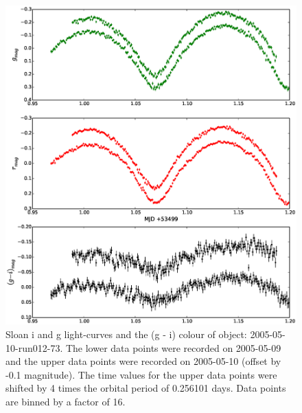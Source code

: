    \begin{figure}
     \center
     \includegraphics[width=120mm]{images/2005-05-10-run012-phasedlc.eps} 
     \caption{Sloan i and g light-curves and the (g - i) colour of object: 2005-05-10-run012-73. The lower data points were recorded on 2005-05-09 and the upper data points were recorded on 2005-05-10 (offset by -0.1 magnitude). The time values for the upper data points were shifted by 4 times the orbital period of 0.256101 days. Data points are binned by a factor of 16. }
     \label{fig:2005-05-10-run012}
   \end{figure}

  

